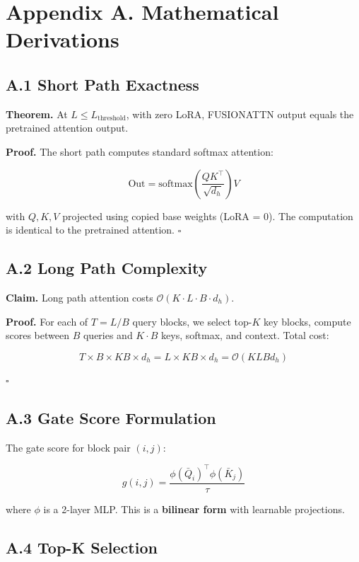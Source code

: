 \section{Appendix A. Mathematical Derivations}

\subsection{A.1 Short Path Exactness}

\textbf{Theorem.} At $L \leq L_\text{threshold}$, with zero LoRA, FUSIONATTN 
output equals the pretrained attention output.

\textbf{Proof.} The short path computes standard softmax attention:

\[
\text{Out} = \text{softmax}\!\left(\frac{Q K^\top}{\sqrt{d_h}}\right) V
\tag{A.1}
\]

with $Q, K, V$ projected using copied base weights (LoRA = 0). The 
computation is identical to the pretrained attention. $\square$

\subsection{A.2 Long Path Complexity}

\textbf{Claim.} Long path attention costs $\mathcal{O}(K \cdot L \cdot B \cdot d_h)$.

\textbf{Proof.} For each of $T = L/B$ query blocks, we select top-$K$ key 
blocks, compute scores between $B$ queries and $K \cdot B$ keys, softmax, 
and context. Total cost:

\[
T \times B \times K B \times d_h = L \times K B \times d_h = \mathcal{O}(K L B d_h)
\tag{A.2}
\]

$\square$

\subsection{A.3 Gate Score Formulation}

The gate score for block pair $(i, j)$:

\[
g(i, j) = \frac{\phi(\bar{Q}_i)^\top \phi(\bar{K}_j)}{\tau}
\tag{A.3}
\]

where $\phi$ is a 2-layer MLP. This is a \textbf{bilinear form} with learnable 
projections.

\subsection{A.4 Top-K Selection}

